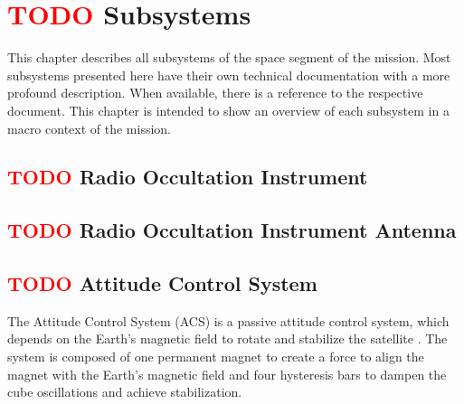 %
%
%
%
%

%
%
%
%
%
%

\chapter{ \textcolor{red}{TODO} Subsystems} \label{ch:subsystems}



This chapter describes all subsystems of the space segment of the mission. Most subsystems presented here have their own technical documentation with a more profound description. When available, there is a reference to the respective document. This chapter is intended to show an overview of each subsystem in a macro context of the mission.

\section{ \textcolor{red}{TODO} Radio Occultation Instrument}


\section{ \textcolor{red}{TODO} Radio Occultation Instrument Antenna}


\section{ \textcolor{red}{TODO} Attitude Control System}

The Attitude Control System (ACS) is a passive attitude control system, which depends on the Earth's magnetic field to rotate and stabilize the satellite \cite{santoni2009,gerhardt2010}. The system is composed of one permanent magnet to create a force to align the magnet with the Earth's magnetic field and four hysteresis bars to dampen the cube oscillations and achieve stabilization.


